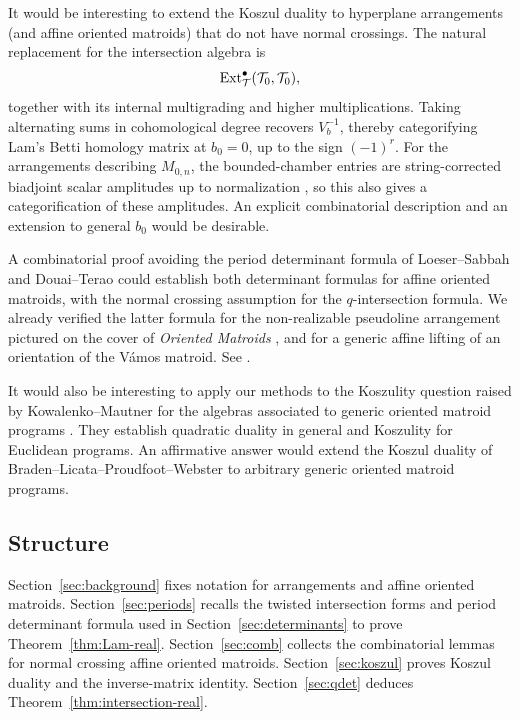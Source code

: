 \begin{enumerate*}[label=(\arabic*), mode=unboxed, itemjoin=\endgraf\noindent]
\item
It would be interesting to extend the Koszul duality to hyperplane arrangements (and affine oriented matroids) that do not have normal
crossings. The natural replacement for the intersection algebra is
\[
 \operatorname{Ext}_{\mathcal T}^{\bullet}(\mathcal T_0,\mathcal T_0),
\]
together with its internal multigrading and higher multiplications.
Taking alternating sums in cohomological degree recovers $V_b^{-1}$,
thereby categorifying Lam's Betti homology matrix at $b_0=0$, up to
the sign $(-1)^r$. For the arrangements describing $M_{0,n}$, the
bounded-chamber entries are string-corrected biadjoint scalar amplitudes
up to normalization \cite[Section 19.4]{Lam}, so this also gives a
categorification of these amplitudes. An explicit combinatorial
description and an extension to general $b_0$ would be desirable.

\item
A combinatorial proof avoiding the period determinant formula of
Loeser--Sabbah and Douai--Terao could establish both determinant formulas for
affine oriented matroids, with the normal crossing assumption for
the $q$-intersection formula. We already verified the latter formula
for the non-realizable pseudoline arrangement pictured on the cover
of \emph{Oriented Matroids}
\cite{OrientedMatroids1999}, and for a generic affine lifting of an
orientation of the V\'amos matroid. See \cite[Sections A.2--A.3]{EM}.

\item
It would also be interesting to apply our methods to the Koszulity
question raised by Kowalenko--Mautner for the algebras associated to
generic oriented matroid programs \cite[Section 1.3]{KowalenkoMautner}.
They establish quadratic duality in general and Koszulity for
Euclidean programs. An affirmative answer would extend the Koszul
duality of Braden--Licata--Proudfoot--Webster \cite{BLPWgale} to arbitrary
generic oriented matroid programs.
\end{enumerate*}

\subsection{Structure}
Section~\ref{sec:background} fixes notation for arrangements and affine
oriented matroids. Section~\ref{sec:periods} recalls the twisted
intersection forms and period determinant formula used in
Section~\ref{sec:determinants} to prove Theorem~\ref{thm:Lam-real}.
Section~\ref{sec:comb} collects the combinatorial lemmas for normal
crossing affine oriented matroids. Section~\ref{sec:koszul} proves
Koszul duality and the inverse-matrix identity.
Section~\ref{sec:qdet} deduces Theorem~\ref{thm:intersection-real}.
